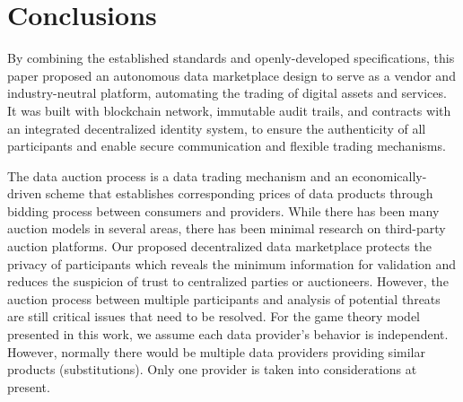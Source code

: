 \documentclass[journal,article,applsci,submit,moreauthors,pdftex]{Definitions/mdpi}
\begin{document}


\section{Conclusions}

By combining the established standards and openly-developed specifications, this paper proposed an autonomous data marketplace design to serve as a vendor and industry-neutral platform, automating the trading of digital assets and services. It was built with blockchain network, immutable audit trails, and contracts with an integrated decentralized identity system, to ensure the authenticity of all participants and enable secure communication and flexible trading mechanisms.

The data auction process is a data trading mechanism and an economically-driven scheme that establishes corresponding prices of data products through bidding process between consumers and providers. While there has been many auction models\cite{BigPicDataMarket} in several areas, there has been minimal research on third-party auction platforms. Our proposed decentralized data marketplace protects the privacy of participants which reveals the minimum information for validation and reduces the suspicion of trust to centralized parties or auctioneers. However, the auction process between multiple participants and analysis of potential threats are still critical issues that need to be resolved. For the game theory model presented in this work, we assume each data provider's behavior is independent. However, normally there would be multiple data providers providing similar products (substitutions). Only one provider is taken into considerations at present.



\end{document}
